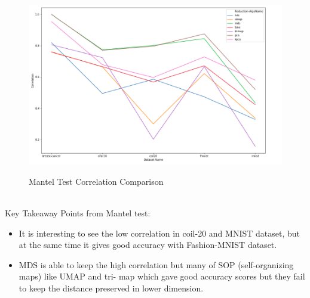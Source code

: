 \documentclass[letterpaper, 10 pt, conference]{ieeeconf}  %
\begin{document}
\begin{figure}[h!]
	\centering
	\includegraphics[width=0.94\linewidth]{mantel.png}
	\label{fig:mantel}
	\caption{Mantel Test Correlation Comparison}
\end{figure}
\vspace{5mm}
\\Key Takeaway Points from Mantel test:
\begin{itemize}
	\item It is interesting to see the low correlation in coil-20 and MNIST dataset, but at the same time it gives good accuracy with Fashion-MNIST dataset.
    \item MDS is able to keep the high correlation but many of SOP (self-organizing maps) like UMAP and tri- map which gave good accuracy scores but they fail to keep the distance preserved in lower dimension.
\end{itemize}

\addtolength{\textheight}{-12cm}   %

\end{document}
